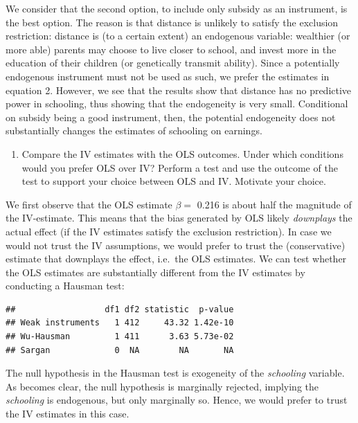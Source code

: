 \documentclass[
]{article}
\newenvironment{Shaded}{\begin{snugshade}}{\end{snugshade}}
\newcommand{\DataTypeTok}[1]{\textcolor[rgb]{0.13,0.29,0.53}{#1}}
\newcommand{\KeywordTok}[1]{\textcolor[rgb]{0.13,0.29,0.53}{\textbf{#1}}}
\newcommand{\NormalTok}[1]{#1}
\newcommand{\OperatorTok}[1]{\textcolor[rgb]{0.81,0.36,0.00}{\textbf{#1}}}
\newcommand{\OtherTok}[1]{\textcolor[rgb]{0.56,0.35,0.01}{#1}}
\newcommand{\StringTok}[1]{\textcolor[rgb]{0.31,0.60,0.02}{#1}}
\providecommand{\tightlist}{%
  \setlength{\itemsep}{0pt}\setlength{\parskip}{0pt}}
\begin{document}
We consider that the second option, to include only subsidy as an
instrument, is the best option. The reason is that distance is unlikely
to satisfy the exclusion restriction: distance is (to a certain extent)
an endogenous variable: wealthier (or more able) parents may choose to
live closer to school, and invest more in the education of their
children (or genetically transmit ability). Since a potentially
endogenous instrument must not be used as such, we prefer the estimates
in equation 2. However, we see that the results show that distance has
no predictive power in schooling, thus showing that the endogeneity is
very small. Conditional on subsidy being a good instrument, then, the
potential endogeneity does not substantially changes the estimates of
schooling on earnings.

\begin{enumerate}
\def\labelenumi{(\alph{enumi})}
\setcounter{enumi}{2}
\tightlist
\item
  Compare the IV estimates with the OLS outcomes. Under which conditions
  would you prefer OLS over IV? Perform a test and use the outcome of
  the test to support your choice between OLS and IV. Motivate your
  choice.
\end{enumerate}

We first observe that the OLS estimate \(\beta =\) 0.216 is about half
the magnitude of the IV-estimate. This means that the bias generated by
OLS likely \emph{downplays} the actual effect (if the IV estimates
satisfy the exclusion restriction). In case we would not trust the IV
assumptions, we would prefer to trust the (conservative) estimate that
downplays the effect, i.e.~the OLS estimates. We can test whether the
OLS estimates are substantially different from the IV estimates by
conducting a Hausman test:

\begin{Shaded}
\end{Shaded}

\begin{verbatim}
##                  df1 df2 statistic  p-value
## Weak instruments   1 412     43.32 1.42e-10
## Wu-Hausman         1 411      3.63 5.73e-02
## Sargan             0  NA        NA       NA
\end{verbatim}

The null hypothesis in the Hausman test is exogeneity of the
\emph{schooling} variable. As becomes clear, the null hypothesis is
marginally rejected, implying the \emph{schooling} is endogenous, but
only marginally so. Hence, we would prefer to trust the IV estimates in
this case.
\end{document}
